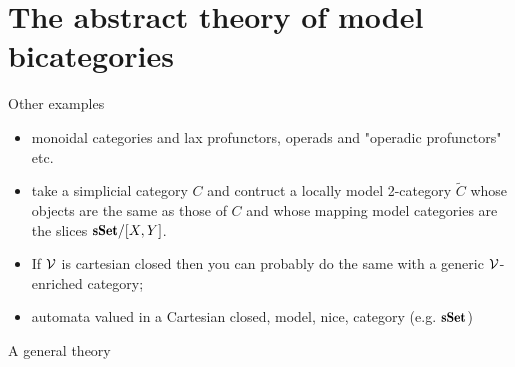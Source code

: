 \documentclass[a4paper,12pt]{amsart}
\begin{document}
\section{The abstract theory of model bicategories}
Other examples
\begin{itemize}
\item monoidal categories and lax profunctors, operads and "operadic profunctors" etc.
\item take a simplicial category $C$ and contruct a locally model 2-category $\widetilde{C}$ whose objects are the same as those of $C$ and whose mapping model categories are the slices $\sSet/[X,Y]$. 
\item If $\mathcal{V}$ is cartesian closed then you can probably do the same with a generic $\mathcal{V}$-enriched category;
\item automata valued in a Cartesian closed, model, nice, category (e.g. $\sSet$)
\end{itemize}
A general theory

{}

\hrulefill
\end{document}
